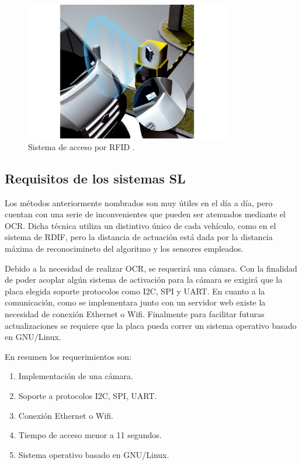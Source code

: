 \begin{figure}[bth]
    \centering
    \includegraphics[width=0.8\textwidth]{imgs/sistema-control-acceso-barreras-rfid.jpg}
    \caption{Sistema de acceso por RFID \cite{noauthor_acceso_nodate}.}
    \label{fig:sistema-moderno}
\end{figure}

\subsection{Requisitos de los sistemas SL}

Los métodos anteriormente nombrados son muy útiles en el día a día, pero cuentan con una serie de inconvenientes que pueden ser atenuados mediante el OCR.
Dicha técnica utiliza un distintivo único de cada vehículo, como en el sistema de RDIF, pero la distancia de actuación está dada por la distancia máxima de reconocimineto del algoritmo y los sensores empleados.

Debido a la necesidad de realizar OCR, se requerirá una cámara. Con la finalidad de poder acoplar algún sistema de activación para la cámara se exigirá que la placa elegida soporte protocolos como I2C, SPI y UART. En cuanto a la comunicación, como se implementara junto con un servidor web existe la necesidad de conexión Ethernet o Wifi. Finalmente para facilitar futuras actualizaciones se requiere que la placa pueda correr un sistema operativo basado en GNU/Linux.

En resumen los requerimientos son:

\begin{enumerate}
    \item Implementación de una cámara.
    \item Soporte a protocolos I2C, SPI, UART.
    \item Conexión Ethernet o Wifi.
    \item Tiempo de acceso menor a 11 segundos.
    \item Sistema operativo basado en GNU/Linux.
\end{enumerate}


